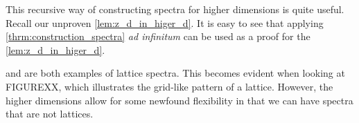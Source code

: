 \documentclass[../thesis.tex]{subfiles}
\begin{document}
This recursive way of constructing spectra for higher dimensions is quite useful. Recall our unproven \cref{lem:z_d_in_higer_d}. It is easy to see that applying \cref{thrm:construction_spectra} \emph{ad infinitum} can be used as a proof for the \cref{lem:z_d_in_higer_d}.

 and  are both examples of lattice spectra. This becomes evident when looking at FIGUREXX, which illustrates the grid-like pattern of a lattice. However, the higher dimensions allow for some newfound flexibility in that we can have spectra that are not lattices. 
\end{document}
